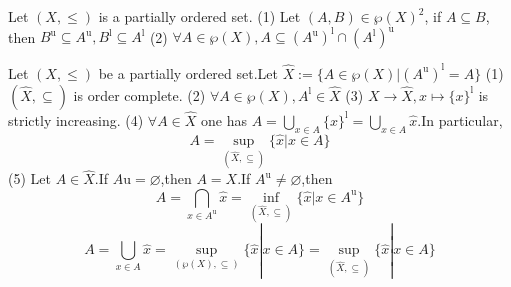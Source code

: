 \documentclass{book}
\numberwithin{equation}{section}
\begin{document}
\begin{lemmaenv}
    Let $(X,\le)$ is a partially ordered set.
    \newline
    (1) Let $(A,B)\in \wp(X)^2$, if $A\subseteq B$, then $B^\mathrm{u}\subseteq A^\mathrm{u},B^\mathrm{l}\subseteq A^\mathrm{l}$
    \newline
    (2) $\forall A\in \wp(X),A\subseteq (A^\mathrm{u})^\mathrm{l}\cap (A^\mathrm{l})^\mathrm{u}$
\end{lemmaenv}

\begin{theoremenv}
    \quad
    \newline
    Let $(X,\le )$ be a partially ordered set.Let $\hat{X}:=\{A\in \wp (X)|(A^\mathrm{u})^\mathrm{l}=A\}$
\newline
(1) $(\hat{X},\subseteq)$ is order complete.
\newline
(2) $\forall A\in \wp(X),A^\mathrm{l}\in \hat{X}$
\newline
(3) $X\rightarrow \hat{X},x\mapsto \{x\}^\mathrm{l}$ is strictly increasing.
\newline
(4) $\forall A\in \hat{X}$ one has $A=\bigcup_{x\in A}\{x\}^\mathrm{l}=\bigcup_{x\in A}\hat{x}$.In particular, 
$$A=\sup_{(\hat{X},\subseteq)}\{\hat{x}|x\in A\}$$
(5) Let $A\in \hat{X}$.If $A\mathrm{u}=\varnothing$,then $A=X$.If $A^\mathrm{u}\not=\varnothing$,then 
$$A=\bigcap_{x\in A^\mathrm{u}}\hat{x}=\inf_{(\hat{X},\subseteq)}\{\hat{x}|x\in A^\mathrm{u}\}$$
$$A=\bigcup_{x\in A}\hat{x}=\sup_{(\wp(X),\subseteq)}\{\hat{x}|x\in A\}=\sup_{(\hat{X},\subseteq)}\{\hat{x}|x\in A\}$$
\end{theoremenv}
\end{document}
